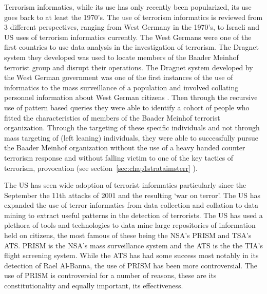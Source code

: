 Terrorism informatics, while its use has only recently been popularized, its use goes back to at least the 1970’s.  The use of terrorism informatics is reviewed from 3 different perspectives, ranging from West Germany in the 1970’s, to Israeli and US uses of terrorism informatics currently. The West Germans were one of the first countries to use data analysis in the investigation of terrorism. 
The Dragnet system they developed was used to locate members of the Baader Meinhof terrorist group and disrupt their operations. The Dragnet system developed by the West German government was one of the first instances of the use of informatics to the mass surveillance of a population and involved collating personnel information about West German citizens . Then through the recursive use of pattern based queries they were able to identify a cohort of people who fitted the characteristics of members of the Baader Meinhof terrorist  organization. Through the targeting of these specific individuals and not through mass targeting of (left leaning) individuals, they were able to successfully pursue the Baader Meinhof organization without the use of a heavy handed counter terrorism response and without falling victim to one of the key tactics of terrorism, provocation (see section~\ref{sec:chap1strataimsterr} ).

The US has seen wide adoption of terrorist informatics particularly since the September the 11th attacks of 2001 and the resulting ‘war on terror’. The US has expanded the use of terror informatics from data collection and collation to data mining to extract useful patterns in the detection of terrorists. The US has used a plethora of tools and technologies to data mine large repositories of information held on citizens, the most famous of these being the NSA’s PRISM and TSA’s ATS. PRISM is the NSA’s mass surveillance system and the ATS is the the TIA’s flight screening system. While the ATS has had some success most notably in its detection of Rael Al-Banna, the use of PRISM has been more controversial. The use of PRISM is controversial for a number of reasons, these are its constitutionality \citep{park2013big} and equally important, its effectiveness. 

